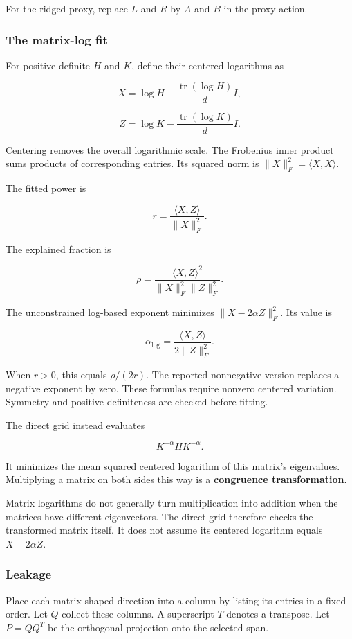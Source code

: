 \documentclass[
  14pt,
  letterpaper,
]{extarticle}
\begin{document}
For the ridged proxy, replace \(L\) and \(R\) by \(A\) and \(B\) in the
proxy action.

\subsubsection{The matrix-log fit}\label{the-matrix-log-fit}

For positive definite \(H\) and \(K\), define their centered logarithms
as

\[X=\log H-\frac{\operatorname{tr}(\log H)}{d}I,\]

\[Z=\log K-\frac{\operatorname{tr}(\log K)}{d}I.\]

Centering removes the overall logarithmic scale. The Frobenius inner
product sums products of corresponding entries. Its squared norm is
\(\|X\|_F^2=\langle X,X\rangle\).

The fitted power is

\[r=\frac{\langle X,Z\rangle}{\|X\|_F^2}.\]

The explained fraction is

\[\rho=\frac{\langle X,Z\rangle^2}{\|X\|_F^2\|Z\|_F^2}.\]

The unconstrained log-based exponent minimizes \(\|X-2\alpha Z\|_F^2\).
Its value is

\[\alpha_{\log}=\frac{\langle X,Z\rangle}{2\|Z\|_F^2}.\]

When \(r>0\), this equals \(\rho/(2r)\). The reported nonnegative
version replaces a negative exponent by zero. These formulas require
nonzero centered variation. Symmetry and positive definiteness are
checked before fitting.

The direct grid instead evaluates

\[K^{-\alpha}HK^{-\alpha}.\]

It minimizes the mean squared centered logarithm of this matrix's
eigenvalues. Multiplying a matrix on both sides this way is a
\textbf{congruence transformation}.

Matrix logarithms do not generally turn multiplication into addition
when the matrices have different eigenvectors. The direct grid therefore
checks the transformed matrix itself. It does not assume its centered
logarithm equals \(X-2\alpha Z\).

\subsubsection{Leakage}\label{leakage}

Place each matrix-shaped direction into a column by listing its entries
in a fixed order. Let \(Q\) collect these columns. A superscript \(T\)
denotes a transpose. Let \(P=QQ^T\) be the orthogonal projection onto
the selected span.
\end{document}
